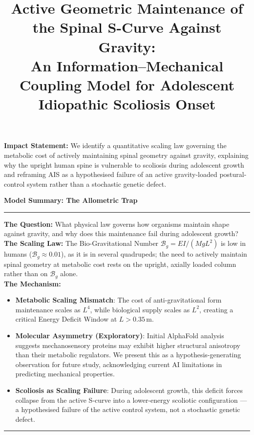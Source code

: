 \documentclass[11pt,a4paper]{article}
\title{Active Geometric Maintenance of the Spinal S-Curve Against Gravity:\\ An Information--Mechanical Coupling Model for Adolescent Idiopathic Scoliosis Onset}
\author{}
\date{}
\newenvironment{mathbox}[1][]
 {\par\vspace{\baselineskip}\noindent\textbf{#1}\par\noindent\rule{\textwidth}{0.4pt}\par\noindent}
 {\par\noindent\rule{\textwidth}{0.4pt}\vspace{\baselineskip}\par}
\begin{document}
\linenumbers
\maketitle



\vspace{0.5em}
\noindent\textbf{Impact Statement:} We identify a quantitative scaling law governing the metabolic cost of actively maintaining spinal geometry against gravity, explaining why the upright human spine is vulnerable to scoliosis during adolescent growth and reframing AIS as a hypothesised failure of an active gravity-loaded postural-control system rather than a stochastic genetic defect.
\vspace{0.5em}

\begin{mathbox}[Model Summary: The Allometric Trap]
\textbf{The Question:} What physical law governs how organisms maintain shape against gravity, and why does this maintenance fail during adolescent growth?\\[4pt]
\textbf{The Scaling Law:} The Bio-Gravitational Number $\mathcal{B}_g = EI/(MgL^2)$ is low in humans ($\mathcal{B}_g \approx 0.01$), as it is in several quadrupeds; the need to actively maintain spinal geometry at metabolic cost rests on the upright, axially loaded column rather than on $\mathcal{B}_g$ alone.\\[4pt]
\textbf{The Mechanism:}
\begin{itemize}
    \item \textbf{Metabolic Scaling Mismatch}: The cost of anti-gravitational form maintenance scales as $L^4$, while biological supply scales as $L^2$, creating a critical Energy Deficit Window at $L > 0.35$\,m.
    \item \textbf{Molecular Asymmetry (Exploratory)}: Initial AlphaFold analysis suggests mechanosensory proteins may exhibit higher structural anisotropy than their metabolic regulators. We present this as a hypothesis-generating observation for future study, acknowledging current AI limitations in predicting mechanical properties.
    \item \textbf{Scoliosis as Scaling Failure}: During adolescent growth, this deficit forces collapse from the active S-curve into a lower-energy scoliotic configuration --- a hypothesised failure of the active control system, not a stochastic genetic defect.
\end{itemize}
\end{mathbox}
\end{document}
